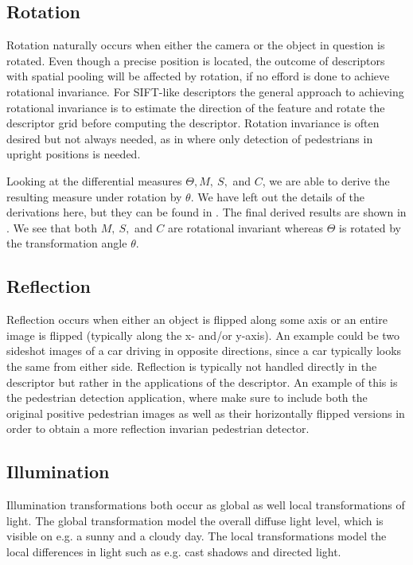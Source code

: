 \documentclass[thesis.tex]{subfiles}
\begin{document}
\subsection{Rotation}
Rotation naturally occurs when either the camera or the object in question is rotated. Even though a precise position is located, the outcome of descriptors with spatial pooling will be affected by rotation, if no efford is done to achieve rotational invariance. For SIFT-like descriptors the general approach to achieving rotational invariance is to estimate the direction of the feature and rotate the descriptor grid before computing the descriptor. Rotation invariance is often desired but not always needed, as in \cite{dalal2005histograms,felzenszwalb2008discriminatively} where only detection of pedestrians in upright positions is needed.

Looking at the differential measures $\Theta, M,~S,$ and $C$, we are able to derive the resulting measure under rotation by $\theta$. We have left out the details of the derivations here, but they can be found in . The final derived results are shown in . We see that both $M,~S,$ and $C$ are rotational invariant whereas $\Theta$ is rotated by the transformation angle $\theta$.
%
\subsection{Reflection}
Reflection occurs when either an object is flipped along some axis or an entire image is flipped (typically along the x- and/or y-axis). An example could be two sideshot images of a car driving in opposite directions, since a car typically looks the same from either side. Reflection is typically not handled directly in the descriptor but rather in the applications of the descriptor. An example of this is the pedestrian detection application, where \cite{dalal2005histograms} make sure to include both the original positive pedestrian images as well as their horizontally flipped versions in order to obtain a more reflection invarian pedestrian detector.

\subsection{Illumination}
\label{sec:illumination}
Illumination transformations both occur as global as well local transformations of light. The global transformation model the overall diffuse light level, which is visible on e.g. a sunny and a cloudy day. The local transformations model the local differences in light such as e.g. cast shadows and directed light.
\end{document}
